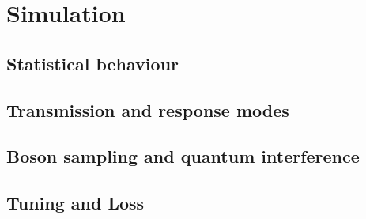 \chapter{Simulation}

\section{Statistical behaviour}

\section{Transmission and response modes}

\section{Boson sampling and quantum interference}

\section{Tuning and Loss}